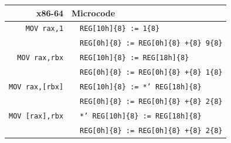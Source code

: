 \documentclass[10pt,twocolumn]{article}
\begin{document}
\begin{table}[!h]
\begin{center}
\begin{tabular}{r|rl}
\textbf{x86-64} & \multicolumn{2}{l}{\textbf{Microcode}}
\\ \hline

\texttt{MOV rax,1} & %
& \texttt{REG[10h]\{8\} := 1\{8\}} \\ & %
& \texttt{REG[0h]\{8\} := REG[0h]\{8\} +\{8\} 9\{8\}} \\ \hline

\texttt{MOV rax,rbx} & %
& \texttt{REG[10h]\{8\} := REG[18h]\{8\}} \\ & %
& \texttt{REG[0h]\{8\} := REG[0h]\{8\} +\{8\} 1\{8\}} \\ \hline

\texttt{MOV rax,[rbx]} & %
%
%
& \texttt{REG[10h]\{8\} := *' REG[18h]\{8\}} \\ & %
& \texttt{REG[0h]\{8\} := REG[0h]\{8\} +\{8\} 2\{8\}} \\ \hline



\texttt{MOV [rax],rbx} & %
%
%
& \texttt{*' REG[10h]\{8\} := REG[18h]\{8\}} \\ & %
& \texttt{REG[0h]\{8\} := REG[0h]\{8\} +\{8\} 2\{8\}} \\ \hline



\end{tabular}
\end{center}
\end{table}
\end{document}
